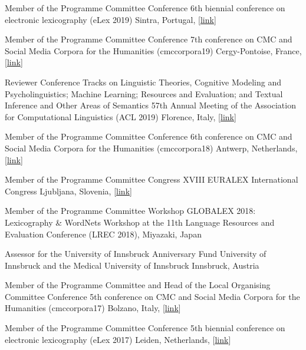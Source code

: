         {Member of the Programme Committee}
        {Conference}
        {6th biennial conference on electronic lexicography (eLex 2019)}
        {Sintra, Portugal, [\href{https://elex.link/elex2019/}{link}]}
        {}

        {Member of the Programme Committee}
        {Conference}
        {7th conference on CMC and Social Media Corpora for the Humanities (cmccorpora19)}
        {Cergy-Pontoise, France, [\href{https://cmccorpora19.sciencesconf.org/}{link}]}
        {}

        {Reviewer}
        {Conference Tracks on Linguistic Theories, Cognitive Modeling and
        Psycholinguistics; Machine Learning; Resources and Evaluation; and
        Textual Inference and Other Areas of Semantics}
        {57th Annual Meeting of the Association for Computational Linguistics (ACL 2019)}
        {Florence, Italy, [\href{http://www.acl2019.org/}{link}]}
        {}

        {Member of the Programme Committee}
        {Conference}
        {6th conference on CMC and Social Media Corpora for the Humanities (cmccorpora18)}
        {Antwerp, Netherlands, [\href{https://www.uantwerpen.be/en/conferences/cmc-social-media-2018/}{link}]}
        {}

        {Member of the Programme Committee}
        {Congress}
        {XVIII EURALEX International Congress}
        {Ljubljana, Slovenia, [\href{https://euralex2018.cjvt.si/}{link}]}
        {}

        {Member of the Programme Committee}
        {Workshop}
        {GLOBALEX 2018: Lexicography \& WordNets}
        {Workshop at the 11th Language Resources and Evaluation Conference
         (LREC 2018), Miyazaki, Japan}
        {}

        {Assessor for the University of Innsbruck}
        {Anniversary Fund}
        {University of Innsbruck and the Medical University of Innsbruck}
        {Innsbruck, Austria}
        {}

        {Member of the Programme Committee and Head of the Local Organising Committee}
        {Conference}
        {5th conference on CMC and Social Media Corpora for the Humanities
         (cmccorpora17)}
        {Bolzano, Italy, [\href{https://cmc-corpora2017.eurac.edu}{link}]}
        {}

        {Member of the Programme Committee}
        {Conference}
        {5th biennial conference on electronic lexicography (eLex 2017)}
        {Leiden, Netherlands, [\href{https://elex.link/elex2017/}{link}]}
        {}

